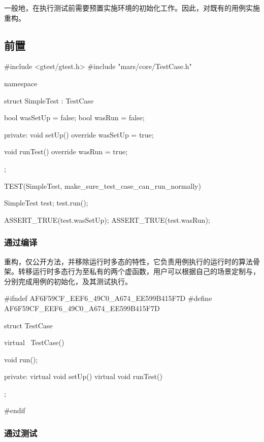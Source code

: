 \begin{content}

一般地，在执行测试前需要预置实施环境的初始化工作。因此，对既有的用例实施重构。

\subsection{前置}

\begin{leftbar}
 \begin{c++}[caption={\ttfamily{test/mars/core/TestCaseSpec.cc}}]
#include <gtest/gtest.h>
#include "mars/core/TestCase.h"

namespace {
  struct SimpleTest : TestCase {
    bool wasSetUp = false;
    bool wasRun = false;

  private:
    void setUp() override {
      wasSetUp = true;
    }

    void runTest() override {
      wasRun = true;
    }
  };
}

TEST(SimpleTest, make_sure_test_case_can_run_normally) {
  SimpleTest test;
  test.run();

  ASSERT_TRUE(test.wasSetUp);
  ASSERT_TRUE(test.wasRun);
}
 \end{c++}
\end{leftbar}

\subsubsection{通过编译}

重构，仅公开方法，并移除运行时多态的特性，它负责用例执行的运行时的算法骨架。转移运行时多态行为至私有的两个虚函数，用户可以根据自己的场景定制与，分别完成用例的初始化，及其测试执行。

\begin{leftbar}
 \begin{c++}[caption={\ttfamily{include/mars/core/TestCase.h}}]
#ifndef AF6F59CF_EEF6_49C0_A674_EE599B415F7D
#define AF6F59CF_EEF6_49C0_A674_EE599B415F7D

struct TestCase {
  virtual ~TestCase() {}

  void run();

private:
  virtual void setUp() {}
  virtual void runTest() {}
};

#endif
  \end{c++}
\end{leftbar}

\subsubsection{通过测试}


\end{content}
